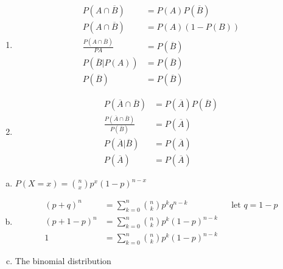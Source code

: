\documentclass[12pt]{article}
\newenvironment{problem}[2][Problem]{\begin{trivlist}
\item[\hskip \labelsep {\bfseries #1}\hskip \labelsep {\bfseries #2.}]
  \vspace{1 cm}
}{\end{trivlist}}
\begin{document}
\begin{problem}{2.55}
\item
  \begin{enumerate}
    \item %
      \begin{align*}
        P(A\cap \overline{B}) &= P(A)P(\overline{B}) \\
        P(A\cap \overline{B}) &= P(A)(1-P(B)) \\
        \frac{P(A\cap \overline{B})}{P{A}} &= P(\overline{B}) \\ 
        P(\overline{B}|P(A)) &= P(\overline{B}) \\ 
        P(\overline{B}) &= P(\overline{B}) 
      \end{align*}
    \item %
      \begin{align*}
        P(\overline{A} \cap \overline{B}) &= P(\overline{A})P(\overline{B}) \\
        \frac{P(\overline{A} \cap \overline{B})}{P(\overline{B})} &= P(\overline{A}) \\
        P(\overline{A}|\overline{B}) &= P(\overline{A}) \\
        P(\overline{A}) &= P(\overline{A})
      \end{align*}
  \end{enumerate}
\end{problem}

\begin{problem}{2.57} 
\item
  \begin{enumerate}[a.]
    \item %
      $P(X=x) = \binom{n}{x}p^x(1-p)^{n-x}$
    \item %
      \begin{align*}
        (p+q)^n &= \sum_{k=0}^{n} \binom{n}{k}p^kq^{n-k} & & \textrm{let } q = 1-p \\
        (p+1-p)^n &= \sum_{k=0}^{n} \binom{n}{k}p^k(1-p)^{n-k} \\
        1 &= \sum_{k=0}^{n} \binom{n}{k}p^k(1-p)^{n-k} 
    \end{align*}
      \item %
        The binomial distribution
  \end{enumerate}
\end{problem}
\end{document}
